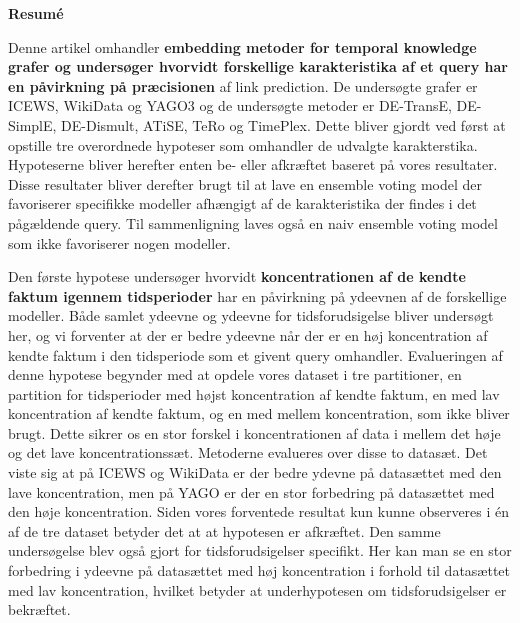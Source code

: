 \thispagestyle{empty}
\begin{center}\Huge\bfseries\sffamily
Resumé
\end{center}
\begin{multicols*}{2}
Denne artikel omhandler \textbf{embedding metoder for temporal knowledge grafer og undersøger hvorvidt forskellige karakteristika af et query har en påvirkning på præcisionen} af link prediction. De undersøgte grafer er ICEWS, WikiData og YAGO3 og de undersøgte metoder er DE-TransE, DE-SimplE, DE-Dismult, ATiSE, TeRo og TimePlex. Dette bliver gjordt ved først at opstille tre overordnede hypoteser som omhandler de udvalgte karakterstika. Hypoteserne bliver herefter enten be- eller afkræftet baseret på vores resultater. Disse resultater bliver derefter brugt til at lave en ensemble voting model der favoriserer specifikke modeller afhængigt af de karakteristika der findes i det pågældende query. Til sammenligning laves også en naiv ensemble voting model som ikke favoriserer nogen modeller. 

Den første hypotese undersøger hvorvidt \textbf{koncentrationen af de kendte faktum igennem tidsperioder} har en påvirkning på ydeevnen af de forskellige modeller. Både samlet ydeevne og ydeevne for tidsforudsigelse bliver undersøgt her, og vi forventer at der er bedre ydeevne når der er en høj koncentration af kendte faktum i den tidsperiode som et givent query omhandler.
Evalueringen af denne hypotese begynder med at opdele vores dataset i tre partitioner, en partition for tidsperioder med højst koncentration af kendte faktum, en med lav koncentration af kendte faktum, og en med mellem koncentration, som ikke bliver brugt. Dette sikrer os en stor forskel i koncentrationen af data i mellem det høje og det lave koncentrationssæt. Metoderne evalueres over disse to datasæt. Det viste sig at på ICEWS og WikiData er der bedre ydevne på datasættet med den lave koncentration, men på YAGO er der en stor forbedring på datasættet med den høje koncentration. Siden vores forventede resultat kun kunne observeres i én af de tre dataset betyder det at at hypotesen er afkræftet. Den samme undersøgelse blev også gjort for tidsforudsigelser specifikt. Her kan man se en stor forbedring i ydeevne på datasættet med høj koncentration i forhold til datasættet med lav koncentration, hvilket betyder at underhypotesen om tidsforudsigelser er bekræftet.


\end{multicols*}

